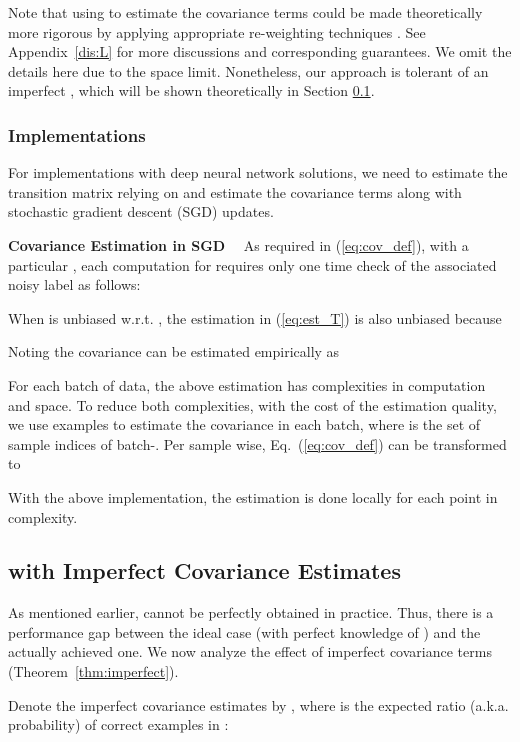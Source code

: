 \documentclass[final]{cvpr}
\newcommand{\rev}[1]{{\color{blue}#1}}
\newcommand{\rev}[1]{#1}
\newcommand{\covpeer}{\text{CAL}}
\begin{document}
{Note that using  to estimate the covariance terms could be made theoretically more rigorous by applying appropriate re-weighting techniques \cite{cheng2017learningdistill,fang2020rethinking,huang2007correcting}.
See Appendix~\ref{dis:L} for more discussions and corresponding guarantees. We omit the details here due to the space limit}. Nonetheless,
our approach is tolerant of an imperfect , which will be shown theoretically in Section \ref{sec:imperfectCov}.

\subsubsection{Implementations}

For implementations with deep neural network solutions, we need to estimate the transition matrix  relying on  and estimate the covariance terms along with stochastic gradient descent (SGD) updates.

\noindent\textbf{Covariance Estimation in SGD}~~
As required in (\ref{eq:cov_def}), with a particular , \rev{each computation for  requires only one time check of the associated noisy label} as follows:

When  is unbiased w.r.t. , the estimation in (\ref{eq:est_T}) is also unbiased because

Noting 
the covariance can be estimated empirically as

\rev{For each batch of data, the above estimation has  complexities in computation and space. To reduce
both complexities, with the cost of the estimation quality, we use  examples to estimate the covariance in each batch, where  is the set of sample indices of batch-. Per sample wise, Eq.~(\ref{eq:cov_def}) can be transformed to}

\rev{With the above implementation, the estimation is done locally for each point in  complexity.}
\subsection{\covpeer{} with Imperfect Covariance Estimates} 
\label{sec:imperfectCov}


As mentioned earlier,  cannot be perfectly obtained in practice. Thus, there is a performance gap between the ideal case (with perfect knowledge of ) and the actually achieved one.
We now analyze the effect of imperfect covariance terms (Theorem~\ref{thm:imperfect}).

Denote the imperfect covariance estimates by , where  is the expected ratio (a.k.a. probability) of correct examples in :
\end{document}
